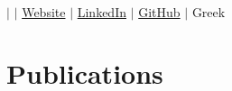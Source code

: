 \documentclass[letterpaper,11pt]{article}
\begin{document}

\begin{center}
    \textbf{\Huge \scshape \name} \\ \vspace{1.25pt}
    \small
    \faMobile \hspace{.5pt} \href{tel:\mobile}{\mobile}
    $|$
    \faAt \hspace{.5pt} \href{mailto:\email}{\email}
    $|$
    \faGlobe \hspace{.5pt} \href{\website}{Website}
    $|$
    \faLinkedinSquare \hspace{.5pt} \href{\linkedin}{LinkedIn}
    $|$
    \faGithub \hspace{.5pt} \href{\gitprofile}{GitHub}
    $|$
    \faMap \hspace{.5pt} Greek
\end{center}















%
\vspace{-0.3cm}


 
\newpage
\section{Publications}
\vspace{0.2cm}
\nocite{*}
\printbibliography

\end{document}
